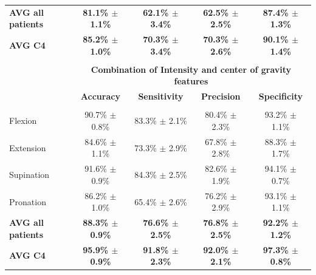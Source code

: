 \begin{table}[]
\begin{tabular}{lcccc}
\textbf{AVG all patients} & \textbf{81.1\% $\pm$ 1.1\%} & \textbf{62.1\% $\pm$ 3.4\%} & \textbf{62.5\% $\pm$ 2.5\%} & \textbf{87.4\% $\pm$ 1.3\%} \\
\textbf{AVG C4}           & \textbf{85.2\% $\pm$ 1.0\%} & \textbf{70.3\% $\pm$ 3.4\%} & \textbf{70.3\% $\pm$ 2.6\%} & \textbf{90.1\% $\pm$ 1.4\%} \\
                          &                             &                             &                             &                             \\
                          & \multicolumn{4}{c}{\large{\textbf{Combination of Intensity and center of gravity features}}}                                  \\
                          & \textbf{Accuracy}           & \textbf{Sensitivity}        & \textbf{Precision}          & \textbf{Specificity}        \\ \hline
                          &                             &                             &                             &                             \\
Flexion                   & 90.7\% $\pm$ 0.8\%          & 83.3\% $\pm$ 2.1\%          & 80.4\% $\pm$ 2.3\%          & 93.2\% $\pm$ 1.1\%          \\
Extension                 & 84.6\% $\pm$ 1.1\%          & 73.3\% $\pm$ 2.9\%          & 67.8\% $\pm$ 2.8\%          & 88.3\% $\pm$ 1.7\%          \\
Supination                & 91.6\% $\pm$ 0.9\%          & 84.3\% $\pm$ 2.5\%          & 82.6\% $\pm$ 1.9\%          & 94.1\% $\pm$ 0.7\%          \\
Pronation                 & 86.2\% $\pm$ 1.0\%          & 65.4\% $\pm$ 2.6\%          & 76.2\% $\pm$ 2.9\%          & 93.1\% $\pm$ 1.1\%           \\ \hline
\textbf{AVG all patients} & \textbf{88.3\% $\pm$ 0.9\%} & \textbf{76.6\% $\pm$ 2.5\%} & \textbf{76.8\% $\pm$ 2.5\%} & \textbf{92.2\% $\pm$ 1.2\%} \\
\textbf{AVG C4}           & \textbf{95.9\% $\pm$ 0.9\%} & \textbf{91.8\% $\pm$ 2.3\%} & \textbf{92.0\% $\pm$ 2.1\%} & \textbf{97.3\% $\pm$ 0.8\%}
\end{tabular}
\end{table}

